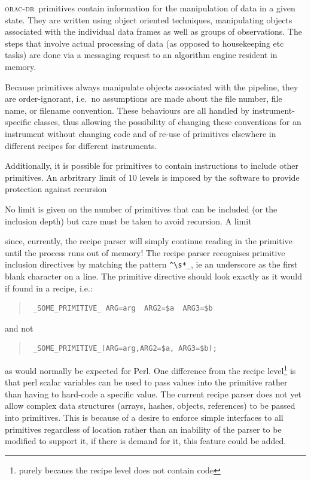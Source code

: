 \documentclass[twoside,11pt]{article}
\renewcommand{\_}{\texttt{\symbol{95}}}
\newcommand{\Oracdr}{\textsc{orac-dr}}
\newenvironment{myquote}{\begin{quote}\begin{small}}{\end{small}\end{quote}}
\begin{document}
\Oracdr\ primitives contain information for the manipulation of data in a
given state. They are written using object oriented techniques,
manipulating objects associated with the individual data frames as
well as groups of observations. The steps that involve actual
processing of data (as opposed to housekeeping etc tasks) are done via
a messaging request to an algorithm engine resident in memory.

Because primitives always manipulate objects associated with the
pipeline, they are order-ignorant, i.e.\ no assumptions are made about
the file number, file name, or filename convention. These behaviours
are all handled by instrument-specific classes, thus allowing the
possibility of changing these conventions for an instrument without
changing code and of re-use of primitives elsewhere in different
recipes for different instruments.

Additionally, it is possible for primitives to contain instructions to
include other primitives. An arbritrary limit of 10 levels is imposed
by the software to provide protection against recursion 

No limit is given on the number of
primitives that can be included (or the inclusion depth) but care must 
be taken to avoid recursion. A limit

 since, currently, the recipe parser will
simply continue reading in the primitive until the process runs out of 
memory! The recipe parser recognises primitive inclusion directives
by matching the pattern \verb|^\s*_|, ie an underscore as the first
blank character on a line. The primitive directive should look exactly 
as it would if found in a recipe, i.e.:
\begin{myquote}
\begin{verbatim}
 _SOME_PRIMITIVE_ ARG=arg  ARG2=$a  ARG3=$b
\end{verbatim}
\end{myquote}
and not
\begin{myquote}
\begin{verbatim}
 _SOME_PRIMITIVE_(ARG=arg,ARG2=$a, ARG3=$b);
\end{verbatim}
\end{myquote}
as would normally be expected for Perl. One difference from the recipe 
level\footnote{purely becaues the recipe level does not contain code} is that
perl scalar variables can be used to pass values into the primitive
rather than having to hard-code a specific value. The current recipe
parser does not yet allow complex data structures (arrays, hashes,
objects, references) to be passed into primitives. This is because
of a desire to enforce simple interfaces to all primitives regardless
of location rather than an inability of the parser to be modified to
support it, if there is demand for it, this feature could be added.
\end{document}

